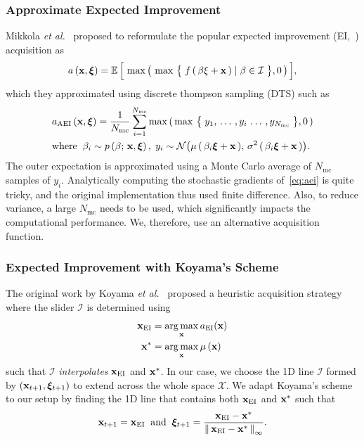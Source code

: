 \subsubsection{Approximate Expected Improvement}
Mikkola \textit{et al.}~\cite{10.1145/3072959.3073598} proposed to reformulate the popular expected improvement (EI,~\cite{jones_efficient_1998}) acquisition as
\begin{align}
  a\,(\mathbf{x}, \bm{\xi})
  = \mathbb{E}\,\Big[\, \max\big(\, \max\,\big\{\; f\,(\,\beta \xi + \mathbf{x}\,) \mid \beta \in \mathcal{I} \;\big\}, 0 \,\big)\,\Big],
\end{align}
which they approximated using discrete thompson sampling (DTS) such as
\begin{align}
  &a_{\mathrm{AEI}}\,(\mathbf{x}, \bm{\xi}) 
  = \frac{1}{N_{\mathrm{mc}}} \sum_{i=1}^{N_{\mathrm{mc}}} \max\,(\, \max\,\big\{\; y_1,\, \ldots \,, y_i \, \ldots \,, y_{N_\text{mc}} \;\big\}, 0 \,) \label{eq:aei} \\
  &\text{where} \;\;  \beta_i \sim p\left(\beta;\, \mathbf{x}, \bm{\xi}\right),\;
  y_i \sim \mathcal{N}\big( \mu\,(\,\beta_i \bm{\xi} + \mathbf{x} \,),\, \sigma^2\,(\, \beta_i \bm{\xi} + \mathbf{x} \,) \big).\nonumber
\end{align}
The outer expectation is approximated using a Monte Carlo average of \(N_{\text{mc}}\) samples of \(y_i\).
Analytically computing the stochastic gradients of~\cref{eq:aei} is quite tricky, and the original implementation thus used finite difference.
Also, to reduce variance, a large \(N_{\text{mc}}\) needs to be used, which significantly impacts the computational performance.
We, therefore, use an alternative acquisition function.

\subsubsection{Expected Improvement with Koyama's Scheme}
The original work by Koyama \textit{et al.}~\cite{koyama_sequential_2020} proposed a heuristic acquisition strategy where the slider \(\mathcal{I}\) is determined using
\begin{align}
  \mathbf{x}_{\mathrm{EI}}   &= \operatorname*{arg\,max}_{\mathbf{x}} a_{\mathrm{EI}}(\mathbf{x}) \label{eq:koyama_ei} \\
  \mathbf{x}^*   &= \operatorname*{arg\,max}_{\mathbf{x}} \mu\,(\mathbf{x}) \label{eq:koyama_opt}
\end{align}
such that \(\mathcal{I}\) \textit{interpolates} \(\mathbf{x}_{\mathrm{EI}}\) and \(\mathbf{x}^*\).
In our case, we choose the 1D line \(\mathcal{I}\) formed by \((\mathbf{x}_{t+1}, \bm{\xi}_{t+1})\) to extend across the whole space \(\mathcal{X}\).
We adapt Koyama's scheme to our setup by finding the 1D line that contains both \(\mathbf{x}_{\mathrm{EI}}\) and \(\mathbf{x}^*\) such that
\begin{align}
  \mathbf{x}_{t+1}   = \mathbf{x}_{\mathrm{EI}}\;\; \text{and} \;\;
  \bm{\xi}_{t+1} = \frac{\mathbf{x}_{\mathrm{EI}} - \mathbf{x}^*}{\left\lVert\,  \mathbf{x}_{\mathrm{EI}} - \mathbf{x}^*  \,\right\rVert_{\infty}}.\label{eq:xi_proj}
\end{align}

